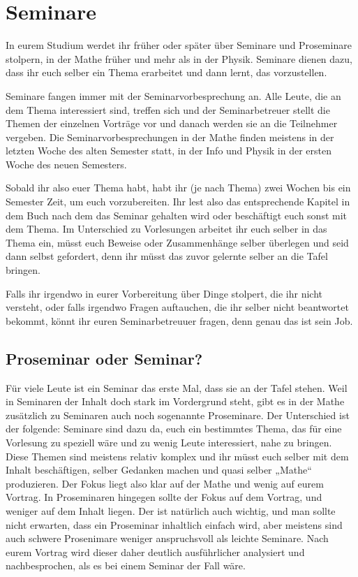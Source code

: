 \section{Seminare}

In eurem Studium werdet ihr früher oder später über Seminare und Proseminare
stolpern, in der Mathe früher und mehr als in der Physik.
Seminare dienen dazu, dass ihr euch selber ein Thema erarbeitet und dann lernt,
das vorzustellen.

Seminare fangen immer mit der Seminarvorbesprechung an. Alle Leute, die an dem
Thema interessiert sind, treffen sich und der Seminarbetreuer stellt die Themen
der einzelnen Vorträge vor und danach werden sie an die Teilnehmer vergeben.
Die Seminarvorbesprechungen in der Mathe finden meistens in der letzten Woche
des alten Semester statt, in der Info und Physik in der ersten Woche des neuen
Semesters.

Sobald ihr also euer Thema habt, habt ihr (je nach Thema) zwei Wochen bis ein
Semester Zeit, um euch vorzubereiten. Ihr lest also das entsprechende Kapitel
in dem Buch nach dem das Seminar gehalten wird oder beschäftigt euch sonst
mit dem Thema. Im Unterschied zu Vorlesungen arbeitet ihr euch selber in das
Thema ein, müsst euch Beweise oder Zusammenhänge selber überlegen und seid dann
selbst gefordert, denn ihr müsst das zuvor gelernte selber an die Tafel bringen.

Falls ihr irgendwo in eurer Vorbereitung über Dinge stolpert, die ihr nicht
versteht, oder falls irgendwo Fragen auftauchen, die ihr selber nicht
beantwortet bekommt, könnt ihr euren Seminarbetreuuer fragen, denn genau das
ist sein Job.

\subsection{Proseminar oder Seminar?}
Für viele Leute ist ein Seminar das erste Mal, dass sie an der Tafel stehen.
Weil in Seminaren der Inhalt doch stark im Vordergrund steht, gibt es in der
Mathe zusätzlich zu Seminaren auch noch sogenannte Proseminare. Der Unterschied
ist der folgende:
Seminare sind dazu da, euch ein bestimmtes Thema, das für eine Vorlesung zu
speziell wäre und zu wenig Leute interessiert, nahe zu bringen.
Diese Themen sind meistens relativ komplex und ihr müsst euch selber mit dem
Inhalt beschäftigen, selber Gedanken machen und quasi selber „Mathe“
produzieren. Der Fokus liegt also klar auf der Mathe und wenig auf eurem
Vortrag.
In Proseminaren hingegen sollte der Fokus auf dem Vortrag, und weniger auf dem
Inhalt liegen. Der ist natürlich auch wichtig, und man sollte nicht erwarten,
dass ein Proseminar inhaltlich einfach wird, aber meistens sind auch schwere
Prosenimare weniger anspruchsvoll als leichte Seminare.
Nach eurem Vortrag wird dieser daher deutlich ausführlicher analysiert und
nachbesprochen, als es bei einem Seminar der Fall wäre.

